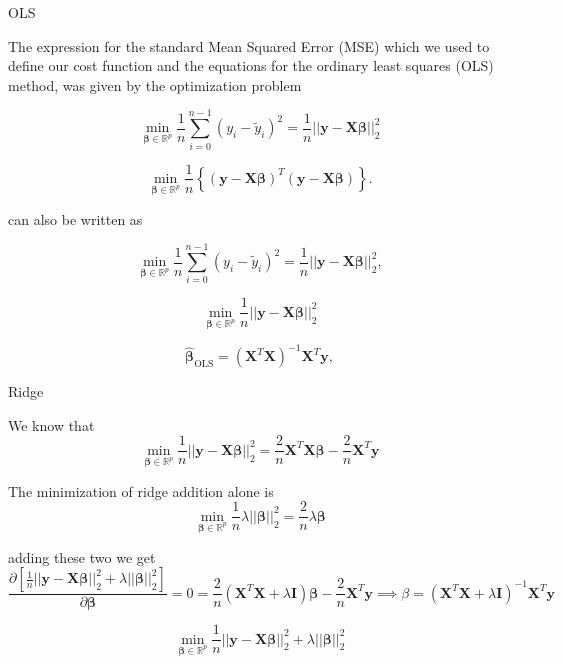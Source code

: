 \documentclass[twoside,11pt]{report}
\begin{document}
OLS

The expression for the standard Mean Squared Error (MSE) which we used to define our cost function and the equations for the ordinary least squares (OLS) method, was given by the
optimization problem

$$
{\displaystyle \min_{\boldsymbol{\beta}\in
{\mathbb{R}}^{p}}}\frac{1}{n}\sum_{i=0}^{n-1}\left(y_i-\tilde{y}_i\right)^2=\frac{1}{n}\vert\vert \boldsymbol{y}-\boldsymbol{X}\boldsymbol{\beta}\vert\vert_2^2
$$

$$
{\displaystyle \min_{\mathbf{\beta}\in {\mathbb{R}}^{p}}}\frac{1}{n}\left\{\left(\mathbf{y}-\mathbf{X}\mathbf{\beta}\right)^T\left(\mathbf{y}-\mathbf{X}\mathbf{\beta}\right)\right\}.
$$

can also be written as 

$$
{\displaystyle \min_{\mathbf{\beta}\in
{\mathbb{R}}^{p}}}\frac{1}{n}\sum_{i=0}^{n-1}\left(y_i-\tilde{y}_i\right)^2=\frac{1}{n}\vert\vert \mathbf{y}-\mathbf{X}\mathbf{\beta}\vert\vert_2^2,
$$


$$
{\displaystyle \min_{\mathbf{\beta}\in
{\mathbb{R}}^{p}}}\frac{1}{n}\vert\vert \mathbf{y}-\mathbf{X}\mathbf{\beta}\vert\vert_2^2
$$


$$
\hat{\mathbf{\beta}}_{\mathrm{OLS}} = \left(\mathbf{X}^T\mathbf{X}\right)^{-1}\mathbf{X}^T\mathbf{y},
$$



Ridge



We know that 
$$
{\displaystyle \min_{\mathbf{\beta}\in
{\mathbb{R}}^{p}}}\frac{1}{n} \vert\vert\mathbf{y}- \mathbf{X}\mathbf{\beta}\vert\vert_2^2 = \frac{2}{n} \mathbf{X}^T\mathbf{X}\mathbf{\beta}-\frac{2}{n}\mathbf{X}^T\mathbf{y}
$$

The minimization of ridge addition alone is
$${\displaystyle \min_{\mathbf{\beta}\in
{\mathbb{R}}^{p}}}\frac{1}{n} \lambda \vert\vert \mathbf{\beta}\vert\vert_2^2 = \frac{2}{n} \lambda \mathbf{\beta}
$$

adding these two we get
$$
    \frac{\partial \left[\frac{1}{n}\vert\vert \mathbf{y}-\mathbf{X}\mathbf{\beta}\vert\vert_2^2+\lambda\vert\vert \mathbf{\beta}\vert\vert_2^2\right]}
    {\partial{\mathbf{\beta}}} = 0 
    = \frac{2}{n}\left(\mathbf{X}^T\mathbf{X}+\lambda\mathbf{I}\right)
    \mathbf{\beta}-\frac{2}{n}\mathbf{X}^T\mathbf{y} \implies \beta = \left(\mathbf{X}^T\mathbf{X}+\lambda\mathbf{I}\right)^{-1}\mathbf{X}^T\mathbf{y}
$$


$$
{\displaystyle \min_{\mathbf{\beta}\in
{\mathbb{R}}^{p}}}\frac{1}{n}\vert\vert \mathbf{y}-\mathbf{X}\mathbf{\beta}\vert\vert_2^2+\lambda\vert\vert \mathbf{\beta}\vert\vert_2^2
$$
\end{document}
